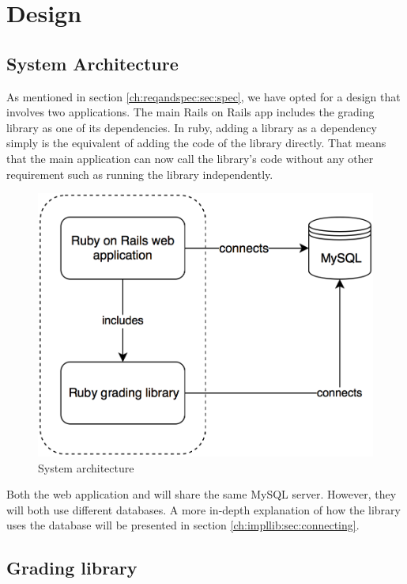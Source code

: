 \chapter{Design}

\section{System Architecture}

As mentioned in section \ref{ch:reqandspec:sec:spec}, we have opted for a design that involves two applications. The main Rails on Rails app includes the grading library as one of its dependencies. In ruby, adding a library as a dependency simply is the equivalent of adding the code of the library directly. That means that the main application can now call the library's code without any other requirement such as running the library independently.

\begin{figure}[H]
    \centering
    \includegraphics[width=(\linewidth / 2)]{Chapters/4-Design/sysarh.png}
    \caption{System architecture}
\end{figure}

Both the web application and will share the same MySQL server. However, they will both use different databases. A more in-depth explanation of how the library uses the database will be presented in section \ref{ch:impllib:sec:connecting}.

\section{Grading library}

